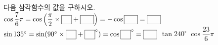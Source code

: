 다음 삼각함수의 값을 구하시오.
 $\cos\dfrac{7}{6}\pi=\cos\left(\dfrac{\pi}{2}\times\blank+\blank[2em]\right)=-\cos\blank[2em]=\blank[2em]$
 $\sin 135^\circ=\sin(90^\circ\times\blank+\blank^{\circ})=\cos\blank^{\circ}=\blank[2em]$
 $\tan 240^\circ$
 $\cos\dfrac{23}{6}\pi$
